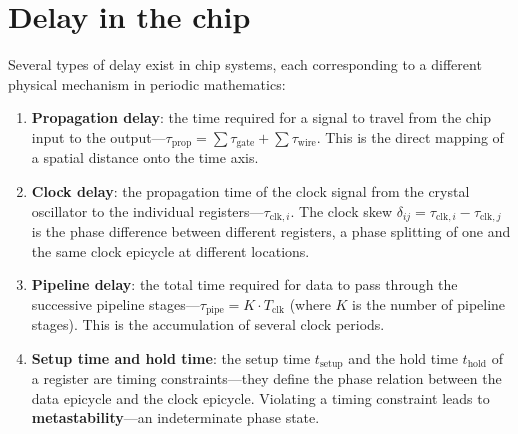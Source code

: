 \section{Delay in the chip}

\begin{definition}\label{def:chip_delay_types}
Several types of delay exist in chip systems, each corresponding to a different physical mechanism in periodic mathematics:
\begin{enumerate}[label=(\roman*)]
    \item \textbf{Propagation delay}: the time required for a signal to travel from the chip input to the output---$\tau_{\text{prop}} = \sum \tau_{\text{gate}} + \sum \tau_{\text{wire}}$. This is the direct mapping of a spatial distance onto the time axis.
    \item \textbf{Clock delay}: the propagation time of the clock signal from the crystal oscillator to the individual registers---$\tau_{\text{clk},i}$. The clock skew $\delta_{ij} = \tau_{\text{clk},i} - \tau_{\text{clk},j}$ is the phase difference between different registers, a phase splitting of one and the same clock epicycle at different locations.
    \item \textbf{Pipeline delay}: the total time required for data to pass through the successive pipeline stages---$\tau_{\text{pipe}} = K \cdot T_{\text{clk}}$ (where $K$ is the number of pipeline stages). This is the accumulation of several clock periods.
    \item \textbf{Setup time and hold time}: the setup time $t_{\text{setup}}$ and the hold time $t_{\text{hold}}$ of a register are timing constraints---they define the phase relation between the data epicycle and the clock epicycle. Violating a timing constraint leads to \textbf{metastability}---an indeterminate phase state.
\end{enumerate}
\end{definition}

